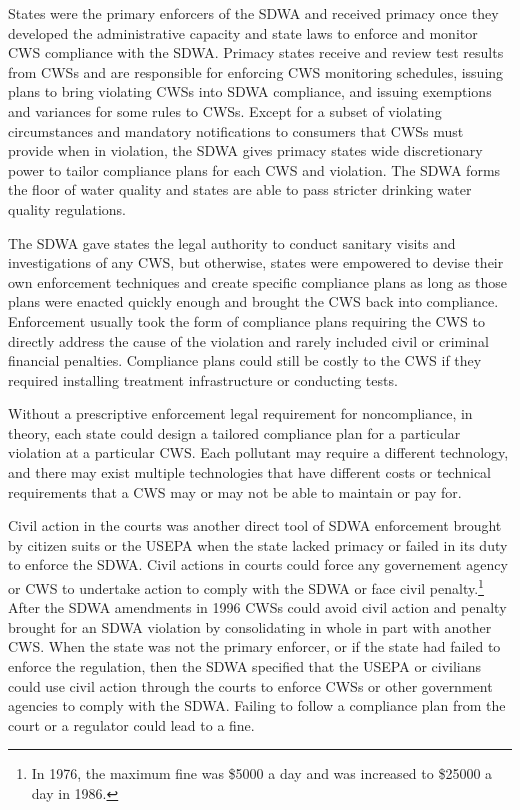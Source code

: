 \documentclass{article}
\begin{document}
States were the primary enforcers of the SDWA and received primacy once they developed the administrative capacity and state laws to enforce and monitor CWS compliance with the SDWA. Primacy states receive and review test results from CWSs and are responsible for enforcing CWS monitoring schedules, issuing plans to bring violating CWSs into SDWA compliance, and issuing exemptions and variances for some rules to CWSs. Except for a subset of violating circumstances and mandatory notifications to consumers that CWSs must provide when in violation, the SDWA gives primacy states wide discretionary power to tailor compliance plans for each CWS and violation. The SDWA forms the floor of water quality and states are able to pass stricter drinking water quality regulations. 
 
The SDWA gave states the legal authority to conduct sanitary visits and investigations of any CWS, but otherwise, states were empowered to devise their own enforcement techniques and create specific compliance plans as long as those plans were enacted quickly enough and brought the CWS back into compliance. Enforcement usually took the form of compliance plans requiring the CWS to directly address the cause of the violation and rarely included civil or criminal financial penalties. Compliance plans could still be costly to the CWS if they required installing treatment infrastructure or conducting tests. 

Without a prescriptive enforcement legal requirement for noncompliance, in theory, each state could design a tailored compliance plan for a particular violation at a particular CWS. Each pollutant may require a different technology, and there may exist multiple technologies that have different costs or technical requirements that a CWS may or may not be able to maintain or pay for. 

Civil action in the courts was another direct tool of SDWA enforcement brought by citizen suits or the USEPA when the state lacked primacy or failed in its duty to enforce the SDWA. Civil actions in courts could force any governement agency or CWS to undertake action to comply with the SDWA or face civil penalty.\footnote{In 1976, the maximum fine was \$5000 a day and was increased to \$25000 a day in 1986.} After the SDWA amendments in 1996 CWSs could avoid civil action and penalty brought for an SDWA violation by consolidating in whole in part with another CWS. When the state was not the primary enforcer, or if the state had failed to enforce the regulation, then the SDWA specified that the USEPA or civilians could use civil action through the courts to enforce CWSs or other government agencies to comply with the SDWA. Failing to follow a compliance plan from the court or a regulator could lead to a fine.
\end{document}
